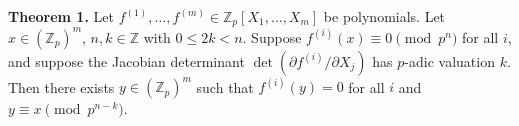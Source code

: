 \textbf{Theorem 1.} Let $f^{(1)}, \ldots, f^{(m)} \in \mathbb{Z}_p[X_1, \ldots, X_m]$ be polynomials. Let $x \in (\mathbb{Z}_p)^m$, $n, k \in \mathbb{Z}$ with $0 \leq 2k < n$. Suppose $f^{(i)}(x) \equiv 0 \pmod{p^n}$ for all $i$, and suppose the Jacobian determinant $\det(\partial f^{(i)}/\partial X_j)$ has $p$-adic valuation $k$. Then there exists $y \in (\mathbb{Z}_p)^m$ such that $f^{(i)}(y) = 0$ for all $i$ and $y \equiv x \pmod{p^{n-k}}$.
